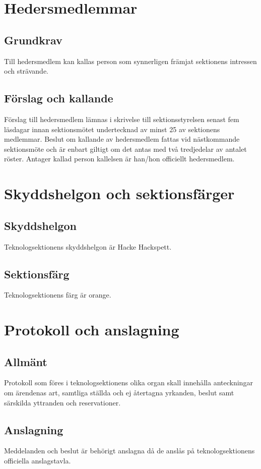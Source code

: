 \documentclass[a4paper, 10pt]{article}
\begin{document}
\section{Hedersmedlemmar}
\subsection{Grundkrav}
Till hedersmedlem kan kallas person som synnerligen främjat sektionens intressen och strävande.
\subsection{Förslag och kallande}
Förslag till hedersmedlem lämnas i skrivelse till sektionsstyrelsen senast fem läsdagar innan sektionsmötet undertecknad av minst 25 av sektionens medlemmar. Beslut om kallande av hedersmedlem fattas vid nästkommande sektionsmöte och är enbart giltigt om det antas med två tredjedelar av antalet röster. Antager kallad person kallelsen är han/hon officiellt hedersmedlem.
\newpage

\section{Skyddshelgon och sektionsfärger}
\subsection{Skyddshelgon}
Teknologsektionens skyddshelgon är Hacke Hackspett.
\subsection{Sektionsfärg}
Teknologsektionens färg är orange.
\newpage

\section{Protokoll och anslagning}
\subsection{Allmänt}
Protokoll som föres i teknologsektionens olika organ skall innehålla anteckningar om ärendenas art, samtliga ställda och ej återtagna yrkanden, beslut samt särskilda yttranden och reservationer.
\subsection{Anslagning}
Meddelanden och beslut är behörigt anslagna då de anslås på teknologsektionens officiella anslagstavla.
\newpage
\end{document}
